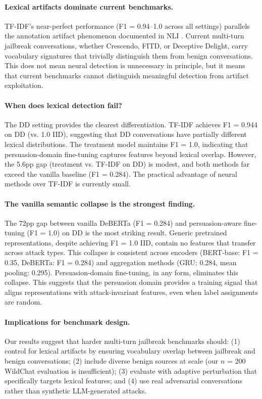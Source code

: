 \documentclass[11pt]{article}
\begin{document}
\paragraph{Lexical artifacts dominate current benchmarks.}
TF-IDF's near-perfect performance (F1 = 0.94--1.0 across all settings) parallels the annotation artifact phenomenon documented in NLI \citep{gururangan2018annotation}. Current multi-turn jailbreak conversations, whether Crescendo, FITD, or Deceptive Delight, carry vocabulary signatures that trivially distinguish them from benign conversations. This does not mean neural detection is unnecessary in principle, but it means that current benchmarks cannot distinguish meaningful detection from artifact exploitation.

\paragraph{When does lexical detection fail?}
The DD setting provides the clearest differentiation. TF-IDF achieves F1 = 0.944 on DD (vs. 1.0 IID), suggesting that DD conversations have partially different lexical distributions. The treatment model maintains F1 = 1.0, indicating that persuasion-domain fine-tuning captures features beyond lexical overlap. However, the 5.6pp gap (treatment vs. TF-IDF on DD) is modest, and both methods far exceed the vanilla baseline (F1 = 0.284). The practical advantage of neural methods over TF-IDF is currently small.

\paragraph{The vanilla semantic collapse is the strongest finding.}
The 72pp gap between vanilla DeBERTa (F1 = 0.284) and persuasion-aware fine-tuning (F1 = 1.0) on DD is the most striking result. Generic pretrained representations, despite achieving F1 = 1.0 IID, contain no features that transfer across attack types. This collapse is consistent across encoders (BERT-base: F1 = 0.35, DeBERTa: F1 = 0.284) and aggregation methods (GRU: 0.284, mean pooling: 0.295). Persuasion-domain fine-tuning, in any form, eliminates this collapse. This suggests that the persuasion domain provides a training signal that aligns representations with attack-invariant features, even when label assignments are random.

\paragraph{Implications for benchmark design.}
Our results suggest that harder multi-turn jailbreak benchmarks should: (1) control for lexical artifacts by ensuring vocabulary overlap between jailbreak and benign conversations; (2) include diverse benign sources at scale (our $n$ = 200 WildChat evaluation is insufficient); (3) evaluate with adaptive perturbation that specifically targets lexical features; and (4) use real adversarial conversations rather than synthetic LLM-generated attacks.
\end{document}
